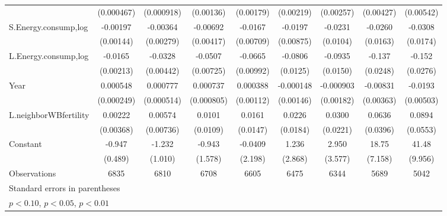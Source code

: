 \begin{table}[htbp]
\begin{tabular}{l*{8}{c}}
                    &  (0.000467)         &  (0.000918)         &   (0.00136)         &   (0.00179)         &   (0.00219)         &   (0.00257)         &   (0.00427)         &   (0.00542)         \\
[1em]
S.Energy.consump,log&    -0.00197         &    -0.00364         &    -0.00692\sym{*}  &     -0.0167\sym{**} &     -0.0197\sym{**} &     -0.0231\sym{**} &     -0.0260         &     -0.0308\sym{*}  \\
                    &   (0.00144)         &   (0.00279)         &   (0.00417)         &   (0.00709)         &   (0.00875)         &    (0.0104)         &    (0.0163)         &    (0.0174)         \\
[1em]
L.Energy.consump,log&     -0.0165\sym{***}&     -0.0328\sym{***}&     -0.0507\sym{***}&     -0.0665\sym{***}&     -0.0806\sym{***}&     -0.0935\sym{***}&      -0.137\sym{***}&      -0.152\sym{***}\\
                    &   (0.00213)         &   (0.00442)         &   (0.00725)         &   (0.00992)         &    (0.0125)         &    (0.0150)         &    (0.0248)         &    (0.0276)         \\
[1em]
Year                &    0.000548\sym{**} &    0.000777         &    0.000737         &    0.000388         &   -0.000148         &   -0.000903         &    -0.00831\sym{**} &     -0.0193\sym{***}\\
                    &  (0.000249)         &  (0.000514)         &  (0.000805)         &   (0.00112)         &   (0.00146)         &   (0.00182)         &   (0.00363)         &   (0.00503)         \\
[1em]
L.neighborWBfertility&     0.00222         &     0.00574         &      0.0101         &      0.0161         &      0.0226         &      0.0300         &      0.0636         &      0.0894         \\
                    &   (0.00368)         &   (0.00736)         &    (0.0109)         &    (0.0147)         &    (0.0184)         &    (0.0221)         &    (0.0396)         &    (0.0553)         \\
[1em]
Constant            &      -0.947\sym{*}  &      -1.232         &      -0.943         &     -0.0409         &       1.236         &       2.950         &       18.75\sym{***}&       41.48\sym{***}\\
                    &     (0.489)         &     (1.010)         &     (1.578)         &     (2.198)         &     (2.868)         &     (3.577)         &     (7.158)         &     (9.956)         \\
\hline
Observations        &        6835         &        6810         &        6708         &        6605         &        6475         &        6344         &        5689         &        5042         \\
\hline\hline
\multicolumn{9}{l}{\footnotesize Standard errors in parentheses}\\
\multicolumn{9}{l}{\footnotesize \sym{*} \(p<0.10\), \sym{**} \(p<0.05\), \sym{***} \(p<0.01\)}\\
\end{tabular}
\end{table}
